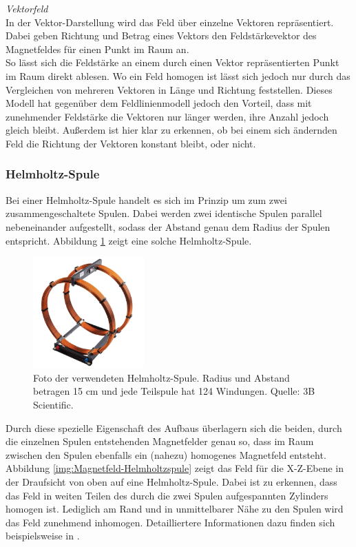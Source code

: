 \textit{Vektorfeld}\\
In der Vektor-Darstellung wird das Feld über einzelne Vektoren repräsentiert. Dabei geben Richtung und Betrag eines Vektors den Feldstärkevektor des Magnetfeldes für einen Punkt im Raum an.\\
So lässt sich die Feldstärke an einem durch einen Vektor repräsentierten Punkt im Raum direkt ablesen. Wo ein Feld homogen ist lässt sich jedoch nur durch das Vergleichen von mehreren Vektoren in Länge und Richtung feststellen. Dieses Modell hat gegenüber dem Feldlinienmodell jedoch den Vorteil, dass mit zunehmender Feldstärke die Vektoren nur länger werden, ihre Anzahl jedoch gleich bleibt. Außerdem ist hier klar zu erkennen, ob bei einem sich ändernden Feld die Richtung der Vektoren konstant bleibt, oder nicht.

\subsubsection{Helmholtz-Spule}
\label{sec-2-3-3}
Bei einer Helmholtz-Spule handelt es sich im Prinzip um zum zwei zusammengeschaltete Spulen. Dabei werden zwei identische Spulen parallel nebeneinander aufgestellt, sodass der Abstand genau dem Radius der Spulen entspricht. Abbildung \ref{img:Helmholtz} zeigt eine solche Helmholtz-Spule.\\
\begin{figure}
	\centering
	\includegraphics[width=0.38\textwidth]{images/papers/Helmholtz.jpg}
	\caption{Foto der verwendeten Helmholtz-Spule. Radius und Abstand betragen 15 cm und jede Teilspule hat 124 Windungen. Quelle: 3B Scientific.}
	\label{img:Helmholtz}
\end{figure}


Durch diese spezielle Eigenschaft des Aufbaus überlagern sich die beiden, durch die einzelnen Spulen entstehenden Magnetfelder genau so, dass im Raum zwischen den Spulen ebenfalls ein (nahezu) homogenes Magnetfeld entsteht. Abbildung \ref{img:Magnetfeld-Helmholtzspule} zeigt das Feld für die X-Z-Ebene in der Draufsicht von oben auf eine Helmholtz-Spule. Dabei ist zu erkennen, dass das Feld in weiten Teilen des durch die zwei Spulen aufgespannten Zylinders homogen ist. Lediglich am Rand und in unmittelbarer Nähe zu den Spulen wird das Feld zunehmend inhomogen. Detailliertere Informationen dazu finden sich beispielsweise in \cite{Demtroder13}.\\

